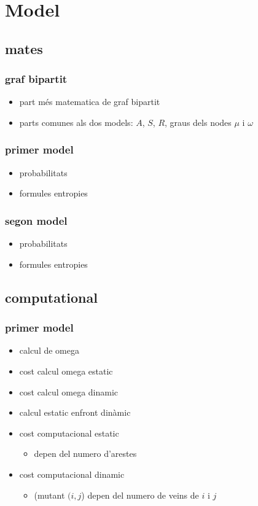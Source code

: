 \chapter{Model}
\section{mates}
\subsection{graf bipartit}
\begin{itemize}
\item part més matematica de graf bipartit
\item parts comunes als dos models: $A$, $S$, $R$, graus dels nodes $\mu$ i
  $\omega$
\end{itemize}
\subsection{primer model}
\begin{itemize}
\item probabilitats
\item formules entropies
\end{itemize}
\subsection{segon model}
\begin{itemize}
\item probabilitats
\item formules entropies
\end{itemize}
\section{computational}
\subsection{primer model}
\begin{itemize}
\item calcul de omega
\item cost calcul omega estatic
\item cost calcul omega dinamic
\item calcul estatic enfront dinàmic
\item cost computacional estatic
  \begin{itemize}
  \item depen del numero d'arestes
  \end{itemize}
\item cost computacional dinamic
  \begin{itemize}
  \item (mutant $(i,j$) depen del numero de veins de $i$ i $j$
  \end{itemize}
\end{itemize}
